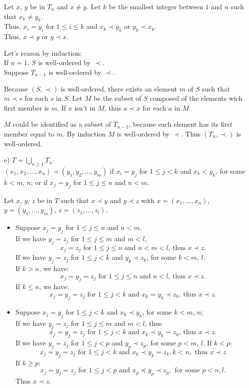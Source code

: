 \documentclass[a4paper,12pt]{article}
\begin{document}
\medskip
Let $x$, $y$ be in $T_n$ and $x \not= y$. Let $k$ be the smallest integer 
between $1$ and $n$ such that $x_k \not= y_k$.\\
Thus, $x_i=y_i$ for $1 \le i \le k$ and $x_k \prec y_k$ or $y_k \prec x_k$.\\
Thus, $x \prec y$ or $y \prec x$.

\medskip
Let's reason by induction:\\
If $n = 1$, $S$ is well-ordered by $\prec$.\\
Suppose $T_{n-1}$ is well-ordered by $\prec$.

Because $(S, \prec)$ is well-ordered, there exists an element
$m$ of $S$ such that $m \prec s$ for each $s$ in $S$.
Let $M$ be the subset of $S$ composed of the elements wich first member is
$m$.  If $x$ isn't in $M$, thus $a \prec x$ for each $a$ in $M$.

$M$ could be identified as a subset of $T_{n-1}$, because each element has its
first member equal to $m$.  By induction $M$ is well-ordered by $\prec$. Thus
$(T_n, \prec)$ is well-ordered.

\medskip
e) $T = \bigcup_{n \ge 1}T_n$.\\
$(x_1,x_2,\ldots,x_n) \prec (y_1,y_2,\ldots,y_m)$ if $x_i = y_j$ for
$1 \le j < k$ and $x_k < y_k$, for some $k < m$, $n$; or if $x_j = y_j$ for
$1 \le j \le n$ and $n < m$.

Let $x$, $y$, $z$ be in $T$ such that $x \prec y$ and $y \prec z$ with
$x = (x_1,\ldots,x_n)$, $y = (y_1,\ldots,y_m)$, $z = (z_1,\dots,z_l)$.
\begin{itemize}
\item
Suppose $x_j = y_j$ for $1 \le j \le n$ and $n < m$.\\
If we have $y_j = z_j$ for $1 \le j \le m$ and $m < l$,
\[x_j = z_j \mbox{ for } 1 \le j \le n \mbox{ and } n < m < l \mbox{, thus }
x \prec z.\]
If we have $y_j = z_j$ for $ 1 \le j < k$ and $y_k \prec z_k$, for some 
$k < m$, $l$.\\
If $k > n$, we have:
\[x_j = y_j = z_j \mbox{ for }1 \le j \le n \mbox{ and } n < l \mbox{, thus } 
x \prec z.\]
If $k \le n$, we have:
\[x_j = y_j = z_j \mbox{ for } 1 \le j < k \mbox{ and } x_k = y_k \prec z_k
\mbox{, thus } x \prec z.\]
\item
Suppose $x_j = y_j$ for $1 \le j < k$ and $x_k \prec y_k$, for some $k < m$, 
$n$;\\
If we have $y_j = z_j$ for $1 \le j \le m$ and $m < l$, thus
\[x_j = y_j = z_j \mbox{ for } 1 \le j < k \mbox{ and } x_k \prec y_k = z_k
\mbox{, thus } x \prec z.\]
If we have $y_j = z_j$ for $1 \le j < p$ and $y_p \prec z_p$, for some 
$p < m$, $l$. If $k < p$:
\[x_j = y_j = z_j \mbox{ for } 1 \le j < k \mbox { and } x_k \prec y_k = z_k,
k < n, \mbox{ thus } x \prec z\]
If $k \ge p$:
\[x_j = y_j = z_j \mbox{ for } 1 \le j < p \mbox{ and } 
x_p \preceq y_p \prec z_p, \mbox { for some } p < n, l.\]
Thus $x \prec z$.
\end{itemize}
\end{document}

